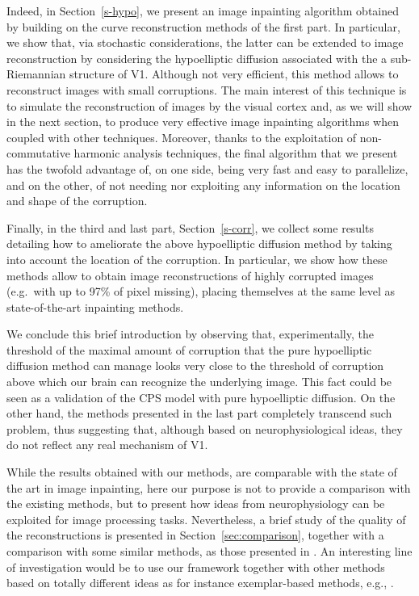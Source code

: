 \documentclass[proc]{edpsmath}
\begin{document}
Indeed, in Section~\ref{s-hypo}, we present an image inpainting algorithm obtained by building on the curve reconstruction methods of the first part. In particular, we show that, via stochastic considerations, the latter can be extended to image reconstruction by considering the hypoelliptic diffusion associated with the a sub-Riemannian structure of V1. Although not very efficient, this method allows to reconstruct images with small corruptions. The main interest of this technique is to simulate the reconstruction of images by the visual cortex and, as we will show in the next section, to produce very effective image inpainting algorithms when coupled with other techniques. Moreover, thanks to the exploitation of non-commutative harmonic analysis techniques, the final algorithm that we present has the twofold advantage of, on one side, being very fast and easy to parallelize, and on the other, of not needing nor exploiting any information on the location and shape of the corruption.

Finally, in the third and last part, Section~\ref{s-corr}, we collect some results detailing how to ameliorate the above hypoelliptic diffusion method by taking into account the location of the corruption. In particular, we show how these methods allow to obtain image reconstructions of highly corrupted images (e.g.\ with up to 97\% of pixel missing), placing themselves at the same level as state-of-the-art inpainting methods.

We conclude this brief introduction by observing that, experimentally, the threshold of the maximal amount of corruption that the pure hypoelliptic diffusion method can manage looks very close to the threshold of corruption above which our brain can recognize the underlying image. This fact could be seen as a validation of the CPS model with pure hypoelliptic diffusion. On the other hand, the methods presented in the last part completely transcend such problem, thus suggesting that, although based on neurophysiological ideas, they do not reflect any real mechanism of V1.

While the results obtained with our methods, are comparable with the state of the art in image inpainting, here our purpose is not to provide a comparison with the existing methods, but to present how ideas from neurophysiology can be exploited for image processing tasks. {\color{magenta} Nevertheless, a brief study of the quality of the reconstructions is presented in Section~\ref{sec:comparison}, together with a comparison with some similar methods, as those presented in \cite{cao,GWWBBS}.} An interesting line of investigation would be to use our framework together with other methods based on totally different ideas as for instance exemplar-based methods, e.g., \cite{Bredies13,Facciolo}.
\end{document}
